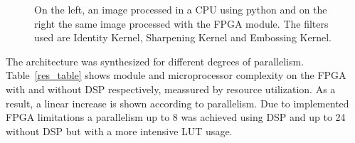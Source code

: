 \documentclass[conference,compsoc]{IEEEtran}
\begin{document}
\begin{figure}[!t]
\centering
{}
\hfil
{}
\hfil
{}
\caption{On the left, an image processed in a CPU using python and on the right the
  same image processed with the FPGA module. The filters used are \protect{}
  Identity Kernel, \protect{} Sharpening Kernel and \protect{} Embossing Kernel.}
\label{images_py_po}
\end{figure}

The architecture was synthesized for different degrees of parallelism.
Table~\ref{res_table} shows module and microprocessor complexity
on the FPGA with and without DSP respectively, meassured by resource utilization. As a result, a linear increase is
shown according to parallelism. Due to implemented FPGA limitations a
parallelism up to 8 was achieved using DSP and up to 24 without DSP but with a
more intensive LUT usage.
\end{document}
